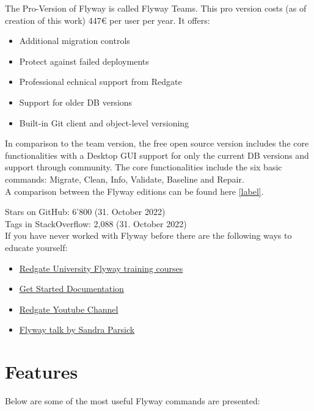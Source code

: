 %
The Pro-Version of Flyway is called Flyway Teams. This pro version costs (as of creation of this work) 447€ per user per year. It offers:
\begin{itemize}
	\item Additional migration controls
	\item Protect against failed deployments
	\item Professional echnical support from Redgate
	\item Support for older DB versions
	\item Built-in Git client and object-level versioning
\end{itemize}

In comparison to the team version, the free open source version includes the core functionalities with a Desktop GUI support for only the current DB versions and support through community. The core functionalities include the six basic commands: Migrate, Clean, Info, Validate, Baseline and Repair.\\

A comparison between the Flyway editions can be found here \autoref{label}.\\

%
Stars on GitHub: 6'800 (31. October 2022)\\
Tags in StackOverflow: 2,088 (31. October 2022)\\

%
If you have never worked with Flyway before there are the following ways to educate yourself:
\begin{itemize}
	\item \href{https://www.red-gate.com/hub/university/courses/flyway}{Redgate University Flyway training courses}
	\item \href{https://flywaydb.org/documentation}{Get Started Documentation}
	\item \href{https://www.youtube.com/playlist?list=PLhFdCK734P8DYHYYWaJpzJJ-qZFZ_JTHM}{Redgate Youtube Channel}
	\item \href{https://www.youtube.com/watch?v=dzRzlDpdDW4}{Flyway talk by Sandra Parsick}
\end{itemize}

\section{Features \label{flyway_features}}
Below are some of the most useful Flyway commands are presented:


